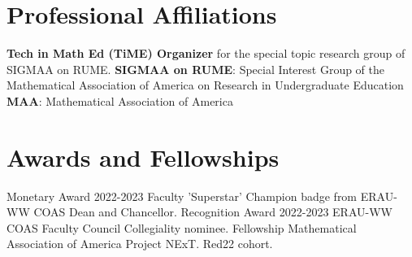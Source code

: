 \documentclass[10pt,a4paper,sans]{moderncv}
\begin{document}


\section{Professional Affiliations}
		{\textbf{Tech in Math Ed (TiME) Organizer} for the special topic research group of SIGMAA on RUME.}
		{\textbf{SIGMAA on RUME}: Special Interest Group of the Mathematical Association of America on Research in Undergraduate Education}
		{\textbf{MAA}: Mathematical Association of America} 

\section{Awards and Fellowships}
		{Monetary Award}
		{}
		{2022-2023 Faculty 'Superstar' Champion badge from ERAU-WW COAS Dean and Chancellor.}
		{}{}
		{Recognition Award}
		{}
		{2022-2023 ERAU-WW COAS Faculty Council Collegiality nominee.}
		{}{}
		{Fellowship}
		{}
		{Mathematical Association of America Project NExT. Red22 cohort.}
	{}{}
\end{document}
